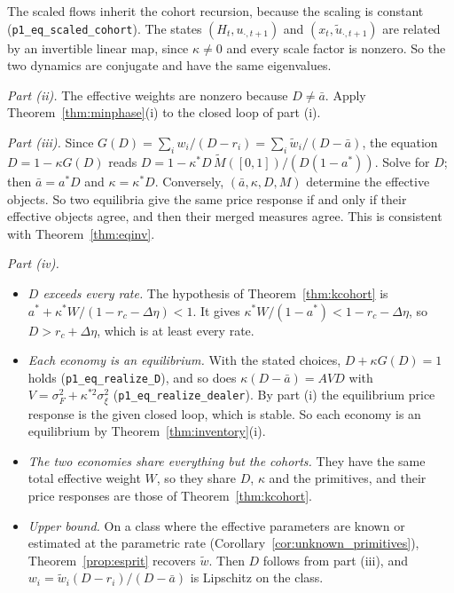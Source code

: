 \documentclass[12pt]{article}
\theoremstyle{definition}
\theoremstyle{remark}
\begin{document}
The scaled flows inherit the cohort recursion, because the scaling is constant (\nolinkurl{p1_eq_scaled_cohort}). The states $(H_t,u_{\cdot,t+1})$ and $(x_t,\tilde u_{\cdot,t+1})$ are related by an invertible linear map, since $\kappa\ne0$ and every scale factor is nonzero. So the two dynamics are conjugate and have the same eigenvalues.

\emph{Part (ii).} The effective weights are nonzero because $D\ne\bar a$. Apply Theorem~\ref{thm:minphase}(i) to the closed loop of part (i).

\emph{Part (iii).} Since $G(D)=\sum_iw_i/(D-r_i)=\sum_i\tilde w_i/(D-\bar a)$, the equation $D=1-\kappa G(D)$ reads $D=1-\kappa^*D\,\tilde M([0,1])/(D(1-a^*))$. Solve for $D$; then $\bar a=a^*D$ and $\kappa=\kappa^*D$. Conversely, $(\bar a,\kappa,D,M)$ determine the effective objects. So two equilibria give the same price response if and only if their effective objects agree, and then their merged measures agree. This is consistent with Theorem~\ref{thm:eqinv}.

\emph{Part (iv).}
\begin{itemize}[itemsep=1pt,topsep=2pt]
\item \emph{$D$ exceeds every rate.} The hypothesis of Theorem~\ref{thm:kcohort} is $a^*+\kappa^*W/(1-r_c-\Delta\eta)<1$. It gives $\kappa^*W/(1-a^*)<1-r_c-\Delta\eta$, so $D>r_c+\Delta\eta$, which is at least every rate.
\item \emph{Each economy is an equilibrium.} With the stated choices, $D+\kappa G(D)=1$ holds (\nolinkurl{p1_eq_realize_D}), and so does $\kappa(D-\bar a)=AVD$ with $V=\sigma_F^2+\kappa^{*2}\sigma_\xi^2$ (\nolinkurl{p1_eq_realize_dealer}). By part (i) the equilibrium price response is the given closed loop, which is stable. So each economy is an equilibrium by Theorem~\ref{thm:inventory}(i).
\item \emph{The two economies share everything but the cohorts.} They have the same total effective weight $W$, so they share $D$, $\kappa$ and the primitives, and their price responses are those of Theorem~\ref{thm:kcohort}.
\item \emph{Upper bound.} On a class where the effective parameters are known or estimated at the parametric rate (Corollary~\ref{cor:unknown_primitives}), Theorem~\ref{prop:esprit} recovers $\tilde w$. Then $D$ follows from part (iii), and $w_i=\tilde w_i(D-r_i)/(D-\bar a)$ is Lipschitz on the class.
\end{itemize}
\end{document}
